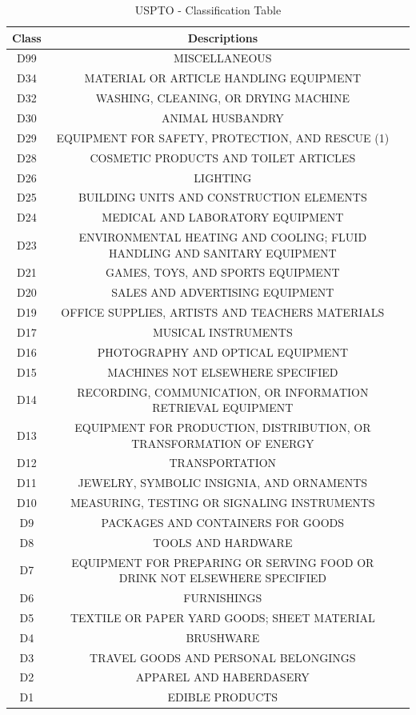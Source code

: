 \documentclass{article}
\begin{document}
\begin{table}[h!]
\begin{adjustbox}{max width=\textwidth}
\begin{tabular}{|c|c|l|} \hline
 Class & Descriptions \\ \hline
D99 & MISCELLANEOUS \\ \hline
D34 & MATERIAL OR ARTICLE HANDLING EQUIPMENT\\ \hline
D32 & WASHING, CLEANING, OR DRYING MACHINE\\ \hline
D30 & ANIMAL HUSBANDRY\\ \hline
D29 & EQUIPMENT FOR SAFETY, PROTECTION, AND RESCUE (1)\\ \hline
D28 & COSMETIC PRODUCTS AND TOILET ARTICLES\\ \hline
D26 & LIGHTING\\ \hline
D25 & BUILDING UNITS AND CONSTRUCTION ELEMENTS\\ \hline
D24 & MEDICAL AND LABORATORY EQUIPMENT\\ \hline
D23 & ENVIRONMENTAL HEATING AND COOLING; FLUID HANDLING AND SANITARY EQUIPMENT\\ \hline
D21 & GAMES, TOYS, AND SPORTS EQUIPMENT\\ \hline
D20 & SALES AND ADVERTISING EQUIPMENT\\ \hline
D19 & OFFICE SUPPLIES, ARTISTS AND TEACHERS MATERIALS\\ \hline
D17 & MUSICAL INSTRUMENTS\\ \hline
D16 & PHOTOGRAPHY AND OPTICAL EQUIPMENT\\ \hline
D15 & MACHINES NOT ELSEWHERE SPECIFIED\\ \hline
D14 & RECORDING, COMMUNICATION, OR INFORMATION RETRIEVAL EQUIPMENT\\ \hline
D13 & EQUIPMENT FOR PRODUCTION, DISTRIBUTION, OR TRANSFORMATION OF ENERGY\\ \hline
D12 & TRANSPORTATION\\ \hline
D11 & JEWELRY, SYMBOLIC INSIGNIA, AND ORNAMENTS\\ \hline
D10 & MEASURING, TESTING OR SIGNALING INSTRUMENTS\\ \hline
D9 & PACKAGES AND CONTAINERS FOR GOODS\\ \hline
D8& TOOLS AND HARDWARE \\ \hline
D7& EQUIPMENT FOR PREPARING OR SERVING FOOD OR DRINK NOT ELSEWHERE SPECIFIED \\ \hline
D6 & FURNISHINGS\\ \hline
D5 & TEXTILE OR PAPER YARD GOODS; SHEET MATERIAL\\ \hline
D4 & BRUSHWARE\\ \hline
D3 & TRAVEL GOODS AND PERSONAL BELONGINGS\\ \hline
D2 & APPAREL AND HABERDASERY\\ \hline
D1 & EDIBLE PRODUCTS\\ \hline
\end{tabular}
\end{adjustbox}
\centering
\caption{USPTO - Classification Table} \label{tab:class}
\end{table}
\end{document}
